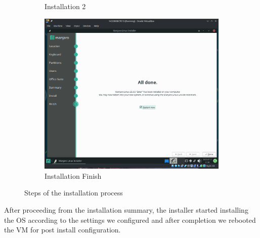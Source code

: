 \documentclass[a4paper,12pt]{report}
\begin{document}
\begin{figure}[h]
\begin{subfigure}[b]{0.3\textwidth}
        \caption{Installation 2}
        \label{fig17}
    \end{subfigure}
    \hfill
    \begin{subfigure}[b]{0.3\textwidth}
        \centering
        \includegraphics[width=\linewidth]{installation_finish.png}
        \caption{Installation Finish}
        \label{fig18}
    \end{subfigure}
    \caption{Steps of the installation process}
\end{figure}
After proceeding from the installation summary, the installer started installing the OS according to the settings we configured and after completion we rebooted the VM for post install configuration. 
\end{document}
